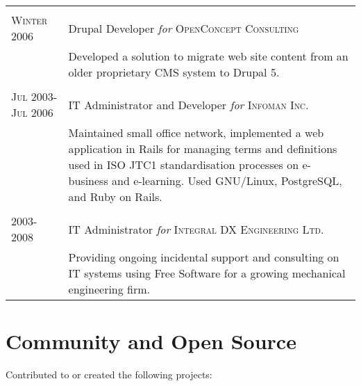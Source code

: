 \documentclass[letterpaper,10pt]{article}
\begin{document}
\begin{longtable}{p{3cm}|p{12cm}}
  \multicolumn{2}{c}{} \\
  \textsc{Winter 2006} & Drupal Developer \emph{for} \textsc{OpenConcept Consulting} \\
   & \footnotesize{Developed a solution to migrate web site content from an older proprietary CMS system to Drupal 5.} \\
  \multicolumn{2}{c}{} \\
  \textsc{Jul 2003-Jul 2006} & IT Administrator and Developer \emph{for} \textsc{Infoman Inc.} \\
   & \footnotesize{Maintained small office network, implemented a web application in Rails for managing terms and definitions used in ISO JTC1 standardisation processes on e-business and e-learning.  Used GNU/Linux, PostgreSQL, and Ruby on Rails.} \\
  \multicolumn{2}{c}{} \\
  \textsc{2003-2008} & IT Administrator \emph{for} \textsc{Integral DX Engineering Ltd.} \\
   & \footnotesize{Providing ongoing incidental support and consulting on IT systems using Free Software for a growing mechanical engineering firm.} \\

\end{longtable}

\pagebreak

\section{Community and Open Source}
Contributed to or created the following projects:
\end{document}
